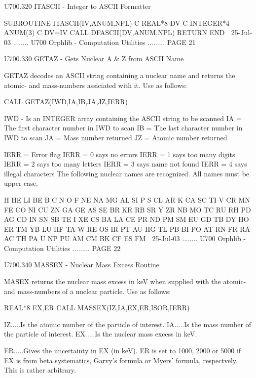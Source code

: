  
 
   U700.320  ITASCII - Integer to ASCII Formatter
 
         SUBROUTINE ITASCII(IV,ANUM,NPL)
   C
         REAL*8 DV
   C
         INTEGER*4 ANUM(3)
   C
         DV=IV
         CALL DFASCII(DV,ANUM,NPL)
         RETURN
         END
    
   25-Jul-03 ........ U700  Orphlib - Computation Utilities ......... PAGE  21
 
   U700.330  GETAZ  -  Gets Nuclear A & Z from ASCII Name
 
   GETAZ  decodes  an  ASCII  string containing a nuclear name and returns the
   atomic- and mass-numbers assiciated with it. Use as follows:
 
          CALL GETAZ(IWD,IA,IB,JA,JZ,IERR)
 
   IWD  - Is an INTEGER array containing the ASCII string to be scanned
   IA   = The first character number in IWD to scan
   IB   = The last  character number in IWD to scan
   JA   = Mass   number returned
   JZ   = Atomic number returned
 
   IERR = Error flag
   IERR = 0 says no errors
   IERR = 1 says too many digits
   IERR = 2 says too many letters
   IERR = 3 says name not found
   IERR = 4 says illegal characters
   The following nuclear names are recognized. All names must be upper
   case.
 
   H   HE  LI  BE  B   C   N   O   F   NE  NA  MG  AL  SI  P
   S   CL  AR  K   CA  SC  TI  V   CR  MN  FE  CO  NI  CU  ZN
   GA  GE  AS  SE  BR  KR  RB  SR  Y   ZR  NB  MO  TC  RU  RH
   PD  AG  CD  IN  SN  SB  TE  I   XE  CS  BA  LA  CE  PR  ND
   PM  SM  EU  GD  TB  DY  HO  ER  TM  YB  LU  HF  TA  W   RE
   OS  IR  PT  AU  HG  TL  PB  BI  PO  AT  RN  FR  RA  AC  TH
   PA  U   NP  PU  AM  CM  BK  CF  ES  FM
    
   25-Jul-03 ........ U700  Orphlib - Computation Utilities ......... PAGE  22
 
 
 
   U700.340  MASSEX - Nuclear Mass Excess Routine
 
   MASEX returns the nuclear  mass  excess  in  keV  when  supplied  with  the
   atomic- and mass-numbers of a nuclear particle. Use as follows:
 
          REAL*8 EX,ER
          CALL MASSEX(IZ,IA,EX,ER,ISOR,IERR)
 
   IZ.....Is the atomic number of the particle of interest.
   IA.....Is the mass number of the particle of interest.
   EX.....Is the nuclear mass excess in keV.
 
   ER.....Gives  the  uncertainty  in  EX (in keV). ER is set to 1000, 2000 or
          5000 if EX is from  beta  systematics,  Garvy's  formula  or  Myers'
          formula, respectvely. This is rather arbitrary.
 

